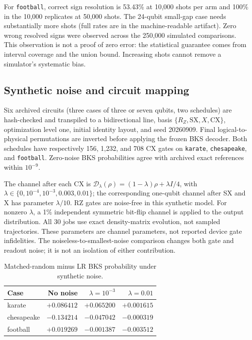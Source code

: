 \documentclass[10pt]{article}
\begin{document}
For \texttt{football}, correct sign resolution is 53.43\% at 10,000 shots per
arm and 100\% in the 10,000 replicates at 50,000 shots. The 24-qubit small-gap
case needs substantially more shots (full rates are in the machine-readable
artifact). Zero wrong resolved signs were observed across the 250,000
simulated comparisons. This observation is not a proof of zero error: the
statistical guarantee comes from interval coverage and the union bound.
Increasing shots cannot remove a simulator's systematic bias.

\subsection{Synthetic noise and circuit mapping}

Six archived circuits (three cases of three or seven qubits, two schedules)
are hash-checked and transpiled to a bidirectional line, basis
$\{R_Z,\mathrm{SX},X,\mathrm{CX}\}$, optimization level one, initial identity
layout, and seed 20260909. Final logical-to-physical permutations are inverted
before applying the frozen BKS decoder. Both schedules have respectively
156, 1,232, and 708 CX gates on \texttt{karate}, \texttt{chesapeake}, and
\texttt{football}. Zero-noise BKS probabilities agree with archived exact
references within $10^{-9}$.

The channel after each CX is $\mathcal D_\lambda(\rho)=(1-\lambda)\rho+
\lambda I/4$, with $\lambda\in\{0,10^{-4},10^{-3},0.003,0.01\}$; the
corresponding one-qubit channel after SX and X has parameter $\lambda/10$.
RZ gates are noise-free in this synthetic model. For nonzero $\lambda$, a
1\% independent symmetric bit-flip channel is applied to the output
distribution. All 30 jobs use exact density-matrix evolution, not sampled
trajectories. These parameters are channel parameters, not reported device
gate infidelities. The noiseless-to-smallest-noise comparison changes both
gate and readout noise; it is not an isolation of either contribution.

\begin{table}[H]
\centering
\caption{Matched-random minus LR BKS probability under synthetic noise.}
\begin{tabular}{lrrr}
\toprule
Case & No noise & $\lambda=10^{-3}$ & $\lambda=0.01$ \\
\midrule
karate & $+0.086412$ & $+0.065200$ & $+0.001615$ \\
chesapeake & $-0.134214$ & $-0.047042$ & $-0.000319$ \\
football & $+0.019269$ & $-0.001387$ & $-0.003512$ \\
\bottomrule
\end{tabular}
\end{table}
\end{document}
